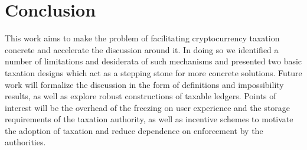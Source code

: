 \section{Conclusion}\label{sec:conclusion}

This work aims to make the problem of facilitating cryptocurrency taxation
concrete and accelerate the discussion around it. In doing so we identified a
number of limitations and desiderata of such mechanisms and presented two basic
taxation designs which act as a stepping stone for more concrete solutions.
Future work will formalize the discussion in the form of definitions and
impossibility results, as well as explore robust constructions of taxable
ledgers. Points of interest will be the overhead of the freezing
on user experience and the storage requirements of the taxation authority,
as well as incentive schemes to motivate the adoption of taxation and reduce
dependence on enforcement by the authorities.
